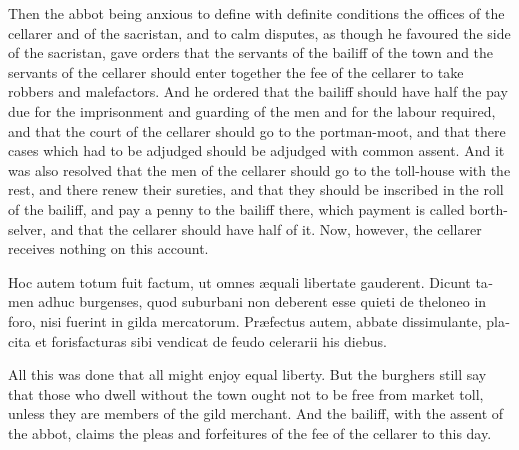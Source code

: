 \documentclass{book}
\begin{document}
\begin{paracol}{2}
\switchcolumn

Then the abbot being anxious to define with definite conditions the offices of the cellarer and of the sacristan, and to calm disputes, as though he favoured the side of the sacristan, gave orders that the servants of the bailiff of the town and the servants of the cellarer should enter together the fee of the cellarer to take robbers and malefactors. And he ordered that the bailiff should have half the pay due for the imprisonment and guarding of the men and for the labour required, and that the court of the cellarer should go to the portman-moot, and that there cases which had to be adjudged should be adjudged with common assent. And it was also resolved that the men of the cellarer should go to the toll-house with the rest, and there renew their sureties, and that they should be inscribed in the roll of the bailiff, and pay a penny to the bailiff there, which payment is called borth-selver, and that the cellarer should have half of it. Now, however, the cellarer receives nothing on this account.

\switchcolumn*

\begin{otherlanguage}{latin}
Hoc autem totum fuit factum, ut omnes \ae{}quali libertate gauderent. Dicunt tamen adhuc burgenses, quod suburbani non deberent esse quieti de theloneo in foro, nisi fuerint in gilda mercatorum. Pr\ae{}fectus autem, abbate dissimulante, placita et forisfacturas sibi vendicat de feudo celerarii his diebus.
\end{otherlanguage}

\switchcolumn

All this was done that all might enjoy equal liberty. But the burghers still say that those who dwell without the town ought not to be free from market toll, unless they are members of the gild merchant. And the bailiff, with the assent of the abbot, claims the pleas and forfeitures of the fee of the cellarer to this day.

\switchcolumn*


\end{paracol}
\end{document}
